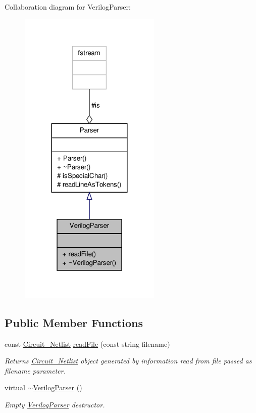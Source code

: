 Collaboration diagram for Verilog\-Parser\-:\nopagebreak
\begin{figure}[H]
\begin{center}
\leavevmode
\includegraphics[width=192pt]{classVerilogParser__coll__graph}
\end{center}
\end{figure}
\subsection*{Public Member Functions}
\begin{DoxyCompactItemize}
\item 
const \hyperlink{classCircuit__Netlist}{Circuit\-\_\-\-Netlist} \hyperlink{classVerilogParser_a9f8740c184e8129a87597a1eae3ed3c4}{read\-File} (const string filename)
\begin{DoxyCompactList}\small\item\em Returns \hyperlink{classCircuit__Netlist}{Circuit\-\_\-\-Netlist} object generated by information read from file passed as filename parameter. \end{DoxyCompactList}\item 
virtual \hyperlink{classVerilogParser_aee565da994b012a04f4d7120b9148ab3}{$\sim$\-Verilog\-Parser} ()
\begin{DoxyCompactList}\small\item\em Empty \hyperlink{classVerilogParser}{Verilog\-Parser} destructor. \end{DoxyCompactList}\end{DoxyCompactItemize}

